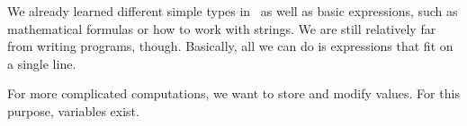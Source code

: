 %
\label{sec:variables}%
%
We already learned different simple types in \python\ as well as basic expressions, such as mathematical formulas or how to work with strings.
We are still relatively far from writing programs, though.
Basically, all we can do is expressions that fit on a single line.

For more complicated computations, we want to store and modify values.
For this purpose, variables exist.%
%
%
%
%
%
%
%
%
\endhsection%
%
